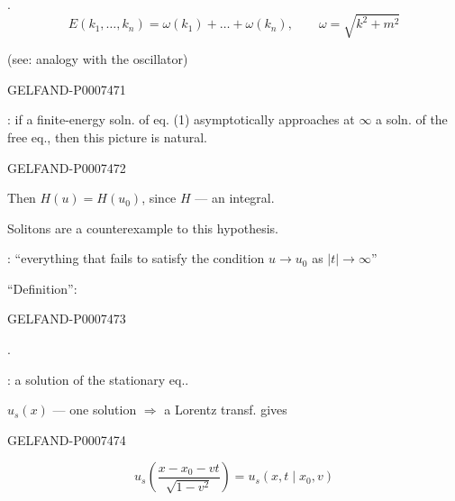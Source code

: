 .
\begin{equation*}
E(k_1,\dots,k_n)=\omega(k_1)+\dots+\omega(k_n),\qquad
\omega=\sqrt{k^2+m^2}
\tag{9}
\end{equation*}

(see: analogy with the oscillator)


\begin{GelfandAdjacentEvidence}{GELFAND-P000747}{1}

: if a finite-energy soln. of eq. (1) asymptotically approaches at \(\infty\) a soln. of the free eq., then this picture is natural.
\end{GelfandAdjacentEvidence}
\begin{GelfandAdjacentEvidence}{GELFAND-P000747}{2}

Then \(H(u)=H(u_0)\), since \(H\) --- an integral.

Solitons are a counterexample to this hypothesis.

: “everything that fails to satisfy the condition \(u\to u_0\) as \(|t|\to\infty\)”

“Definition”: 
\end{GelfandAdjacentEvidence}
\begin{GelfandAdjacentEvidence}{GELFAND-P000747}{3}

.

: a solution of the stationary eq..

\(u_s(x)\) --- one solution \(\Rightarrow\) a Lorentz transf. gives
\end{GelfandAdjacentEvidence}
\begin{GelfandAdjacentEvidence}{GELFAND-P000747}{4}

\begin{equation*}
u_s\left(\frac{x-x_0-vt}{\sqrt{1-v^2}}\right)=u_s(x,t\mid x_0,v)
\tag{10}
\end{equation*}
\end{GelfandAdjacentEvidence}

